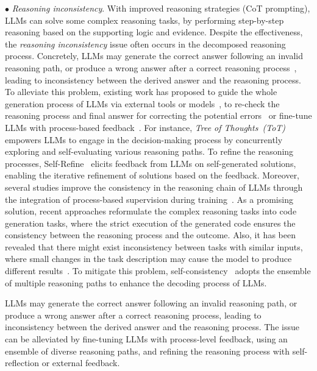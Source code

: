 $\bullet$ \emph{Reasoning inconsistency}.
With improved reasoning strategies (\eg CoT prompting), LLMs can solve some complex reasoning tasks, by performing   
step-by-step reasoning based on the supporting logic and evidence.
Despite the effectiveness, 
the  \emph{reasoning inconsistency} issue often occurs in the decomposed reasoning process. 
Concretely, LLMs may generate the correct answer following an invalid reasoning path, or produce a wrong answer after a correct reasoning process~\cite{Wei-arxiv-2022-chain,Lyu-arxiv-2023-Faithful}, leading to inconsistency between the derived answer and the reasoning process.
{
To alleviate this problem, existing work has proposed to guide the whole generation process of LLMs via external tools or models~\cite{Zhang-ICLR-2023-Planning,Li-arxiv-2022-On,Yao-arxiv-2023-Tree}, to re-check the reasoning process and final answer for correcting the potential errors~\cite{Madaan-arxiv-2023-Refine,Shinn-arxiv-2023-Reflexion,Gou-arxiv-2023-Critic} or fine-tune LLMs with process-based feedback~\cite{Uesate-2023-arxiv-Solving,Lightman-2023-arxiv-Let}. 
For instance, \emph{Tree of Thoughts~(ToT)}~\cite{Yao-arxiv-2023-Tree} empowers LLMs to engage in the decision-making process by concurrently  {exploring and self-evaluating various reasoning paths}.
To refine the {reasoning processes}, Self-Refine~\cite{Madaan-arxiv-2023-Refine} elicits feedback from LLMs on self-generated solutions, {enabling} the iterative refinement of solutions based on the feedback.
Moreover, several studies improve the consistency in the reasoning chain of LLMs through the integration of process-based supervision during training~\cite{Uesate-2023-arxiv-Solving,Lightman-2023-arxiv-Let}.
}
{
As a promising solution, 
recent approaches reformulate the complex reasoning tasks into code generation tasks, where the strict execution of the generated code ensures the consistency between the reasoning process and the outcome.
}
Also, it has been revealed that there might exist   inconsistency between tasks with  similar inputs, where small changes in the task description may cause the model to produce different results~\cite{Patel-NAACL-2021-Are,Lu-arxiv-2022-Survey}.  
{
To mitigate this problem, self-consistency~\cite{Wang-arxiv-2022-Self-Consistency} adopts the ensemble of multiple reasoning paths  to enhance the decoding process of LLMs.
}
\begin{center}
\begin{tcolorbox}[colback=blue!5!white,colframe=blue!55!black,width=0.46\textwidth,title={Reasoning Inconsistency}]
LLMs may generate the correct answer following an invalid reasoning path, or produce a wrong answer after a correct reasoning process, leading to inconsistency between the derived answer and the reasoning process.
{The issue can be alleviated by fine-tuning LLMs with process-level  feedback,  using an ensemble of diverse reasoning paths, and refining the reasoning process with self-reflection or external feedback.}
\end{tcolorbox}
\end{center}

